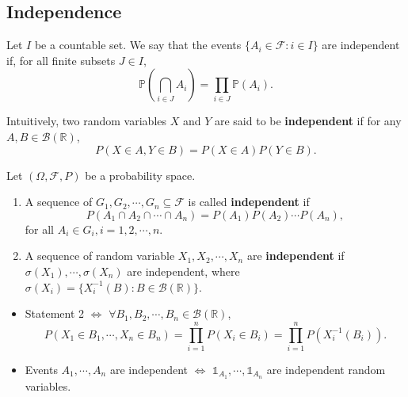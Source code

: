 \documentclass[11pt,singlecolumn, openany, citestyle=authoryear]{elegantbook}
\begin{document}
\begin{CJK}{UTF8}{gbsn}
\section{Independence}
\begin{definition}
    Let $I$ be a countable set.
    We say that the events $\{A_i \in \mathcal{F}  : i \in I\}$ are independent if, 
    for all finite subsets $J \in I$,
    $$
    \mathbb{P} (\bigcap_{i \in J}A_i) = \prod_{i \in J} \mathbb{P} (A_i).
    $$
\end{definition}
\begin{definition}
    Intuitively, two random variables $X$ and $Y$ are said to be \textbf{independent} if 
    for any $ A, B \in \mathcal{B}(\mathbb{R})$,
    $$
    P(X\in A, Y \in B) = P(X \in A)P(Y \in B).
    $$
\end{definition}
\begin{definition}
    Let $(\Omega,\mathcal{F},P)$ be a probability space. 
    \begin{enumerate}
        \item 
            A sequence of $G_1,G_2,\cdots,G_n \subseteq \mathcal{F}$ is called \textbf{independent}
            if 
            $$
            P(A_1\cap A_2 \cap \cdots \cap A_n) = P(A_1)P(A_2)\cdots P(A_n),
            $$
            for all $A_i \in G_i, i = 1,2,\cdots,n$.
        \item
            A sequence of random variable $X_1,X_2,\cdots,X_n$ are \textbf{independent}
            if $\sigma(X_1),\cdots,\sigma(X_n)$ are independent, where 
            $\sigma(X_i)=\{X_i^{-1}(B):B \in \mathcal{B}(\mathbb{R})\}$.
    \end{enumerate}
\end{definition}
\begin{remark}
    \begin{itemize}
    \item Statement 2 $\iff$ $\forall B_1,B_2,\cdots,B_n\in\mathcal{B}(\mathbb{R})$,
        $$
        P(X_1\in B_1,\cdots,X_n\in B_n) = \prod_{i=1}^n P(X_i\in B_i) = \prod_{i=1}^n 
        P(X_i^{-1}(B_i)).
        $$
    \item Events $A_1,\cdots,A_n$ are independent $\iff$ $\mathds{1}_{A_1},\cdots,
    \mathds{1}_{A_n}$ are independent random variables.
    \end{itemize}
\end{remark}


\end{CJK}
\end{document}
